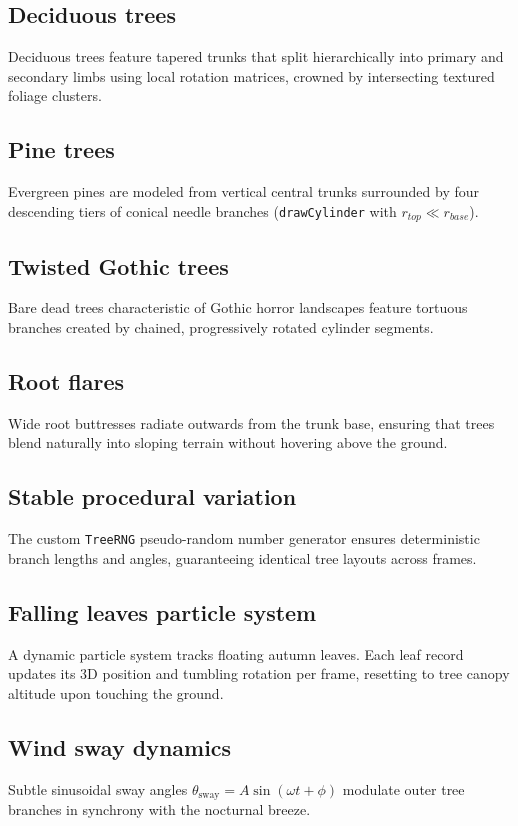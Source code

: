\documentclass[10pt,a4paper,oneside]{article}
\begin{document}
\subsection{Deciduous trees}
Deciduous trees feature tapered trunks that split hierarchically into primary and secondary limbs using local rotation matrices, crowned by intersecting textured foliage clusters.

\subsection{Pine trees}
Evergreen pines are modeled from vertical central trunks surrounded by four descending tiers of conical needle branches (\texttt{drawCylinder} with $r_{top} \ll r_{base}$).

\subsection{Twisted Gothic trees}
Bare dead trees characteristic of Gothic horror landscapes feature tortuous branches created by chained, progressively rotated cylinder segments.

\subsection{Root flares}
Wide root buttresses radiate outwards from the trunk base, ensuring that trees blend naturally into sloping terrain without hovering above the ground.

\subsection{Stable procedural variation}
The custom \texttt{TreeRNG} pseudo-random number generator ensures deterministic branch lengths and angles, guaranteeing identical tree layouts across frames.

\subsection{Falling leaves particle system}
A dynamic particle system tracks floating autumn leaves. Each leaf record updates its 3D position and tumbling rotation per frame, resetting to tree canopy altitude upon touching the ground.

\subsection{Wind sway dynamics}
Subtle sinusoidal sway angles $\theta_{\text{sway}} = A \sin(\omega t + \phi)$ modulate outer tree branches in synchrony with the nocturnal breeze.
\end{document}

